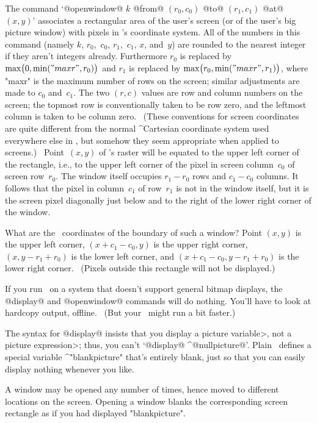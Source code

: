 \ddanger The command `@openwindow@ $k$ @from@ $(r_0,c_0)$ @to@ $(r_1,c_1)$
@at@~$(x,y)$' associates a rectangular area of the user's screen
(or of the user's big picture window) with pixels in \MF's coordinate
system. All of the numbers in this command (namely $k$, $r_0$,~$c_0$,
$r_1$,~$c_1$, $x$, and~$y$) are rounded to the nearest integer if they
aren't integers already. Furthermore $r_0$ is replaced by
$\max\bigl(0,\min("maxr",r_0)\bigr)$ and $r_1$ is replaced by
$\max\bigl(r_0,\min("maxr",r_1)\bigr)$, where "maxr" is the maximum
number of rows on the screen; similar adjustments are made to $c_0$
and~$c_1$. The two $(r,c)$ values are row and column
numbers on the screen; the topmost row is conventionally taken to be
row zero, and the leftmost column is taken to be column zero.
\ (These conventions for screen coordinates are quite different from
the normal ^{Cartesian} coordinate system used everywhere else
in \MF\!, but somehow they seem appropriate when applied to screens.) \
Point~$(x,y)$ of \MF's raster will be equated to the upper left
corner of the rectangle, i.e., to the upper left corner of the pixel
in screen column~$c_0$ of screen row~$r_0$. The window itself
occupies $r_1-r_0$ rows and $c_1-c_0$ columns. It follows that
the pixel in column~$c_1$ of row~$r_1$ is not in the window itself,
but it is the screen pixel diagonally just below and to the right of the
lower right corner of the window.

\ddangerexercise What are the \MF\ coordinates of the boundary of
such a window?
\answer Point $(x,y)$ is the upper left corner, ${(x+c_1-c_0,y)}$ is the
upper right corner, ${(x,y-r_1+r_0)}$ is the lower left corner, and
${(x+c_1-c_0,y-r_1+r_0)}$ is the lower right corner. \ (Pixels
outside this rectangle will not be displayed.)

\danger If you run \MF\ on a system that doesn't support general
bitmap displays, the @display@ and @openwindow@ commands will do
nothing. You'll have to look at hardcopy output, off\/line.
\ (But your \MF\ might run a bit faster.)

\ddanger The syntax for @display@ insists that you display a
\<picture variable>, not a \<picture expression>; thus, you
can't `@display@ ^@nullpicture@'. Plain \MF\ defines a special
variable ^"blankpicture" that's entirely blank, just so that
you can easily display nothing whenever you like.

\ddanger A window may be opened any number of times, hence moved
to different locations on the screen. Opening a window blanks the
corresponding screen rectangle as if you had displayed "blankpicture".

